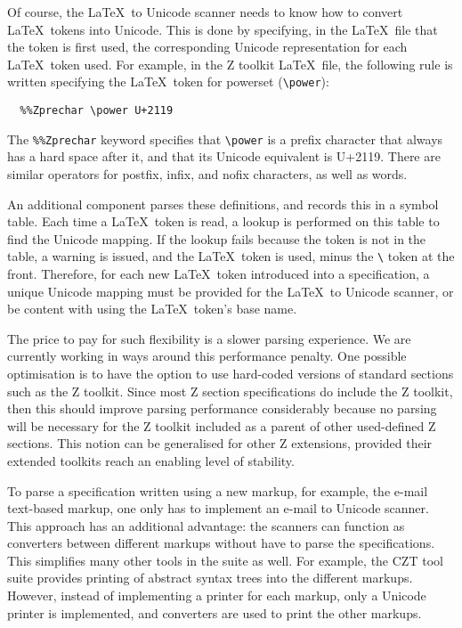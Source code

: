 \documentclass{llncs}
\begin{document}
Of course, the \LaTeX~to Unicode scanner needs to know how to convert
\LaTeX~tokens into Unicode. This is done by specifying, in the \LaTeX\
file that the token is first used, the corresponding Unicode
representation for each \LaTeX~token used. For example, in the Z
toolkit \LaTeX~file, the following rule is written specifying the
\LaTeX\ token for powerset (\verb+\power+):
\begin{verbatim}
  %%Zprechar \power U+2119
\end{verbatim}
%
The {\tt \%\%Zprechar} keyword specifies that \verb+\power+ is a
prefix character that always has a hard space after it, and that its
Unicode equivalent is U+2119. There are
similar operators for postfix, infix, and nofix characters, as well as
words.

An additional component parses these definitions, and records this in
a symbol table. Each time a \LaTeX~token is read, a lookup is
performed on this table to find the Unicode mapping. If the lookup
fails because the token is not in the table, a warning is issued, and
the \LaTeX~token is used, minus the \verb+\+ token at the
front. Therefore, for each new \LaTeX~token introduced into a
specification, a unique Unicode mapping must be provided for the
\LaTeX~to Unicode scanner, or be content with using the \LaTeX~token's
base name.

The price to pay for such flexibility is a slower parsing experience.
We are currently working in ways around this performance penalty.  One
possible optimisation is to have the option to use hard-coded versions
of standard sections such as the Z toolkit.  Since most Z section
specifications do include the Z toolkit, then this should improve
parsing performance considerably because no parsing will be necessary
for the Z toolkit included as a parent of other used-defined Z
sections.  This notion can be generalised for other Z extensions,
provided their extended toolkits reach an enabling level of stability.

To parse a specification written using a new markup, for example, the
e-mail text-based markup, one only has to implement an e-mail to Unicode
scanner. This approach has an additional advantage: the scanners can function as
converters between different markups without have to parse the
specifications. This simplifies many other tools in the suite as
well. For example, the CZT tool suite provides printing of abstract
syntax trees into the different markups. However, instead of
implementing a printer for each markup, only a Unicode printer is
implemented, and converters are used to print the other markups.
\end{document}
